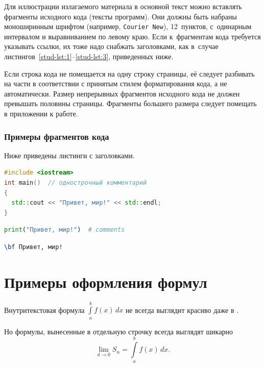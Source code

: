 \documentclass[14pt]{mmcs_article}
\begin{document}
Для иллюстрации излагаемого материала в основной текст можно вставлять фрагменты исходного кода (тексты программ). Они должны быть набраны моноширинным шрифтом (например, \texttt{Courier New}), 12~пунктов, с~одинарным интервалом и выравниванием по левому краю. Если к~фрагментам кода требуется указывать ссылки, их тоже надо снабжать заголовками, как в~случае листингов~\ref{stud-lst:1}--\ref{stud-lst:3}, приведенных ниже.

Если строка кода не помещается на одну строку страницы, её следует разбивать на части в соответствии с принятым стилем форматирования кода, а не автоматически. Размер непрерывных фрагментов исходного кода не должен превышать половины страницы. Фрагменты большего размера следует помещать в приложении к работе.


\subsubsection{Примеры фрагментов кода}

Ниже приведены листинги с заголовками.

\begin{lstlisting}[language=C++, caption={C++, пример кода}, label=stud-lst:1]
#include <iostream>
int main()  // однострочный комментарий
{
  std::cout << "Привет, мир!" << std::endl;
}
\end{lstlisting}


\begin{lstlisting}[language=Python, caption={Python, пример кода}, label=stud-lst:2]
print("Привет, мир!")  # comments
\end{lstlisting}

\begin{lstlisting}[language=TeX, caption=\LaTeX, label=stud-lst:3]
% параметр language в наших листингах только для себя
\bf Привет, мир!
\end{lstlisting}



\newpage
\section{Примеры оформления формул}

Внутритекстовая формула
$ \int\limits_a^b f(x)\,dx$ не всегда выглядит красиво даже в \LaTeXe.

Но формулы, вынесенные в отдельную строчку всегда выглядят шикарно
\[
  \lim_{d\to 0} S_n =
  \int\limits_a^b f(x)\,dx.
\]
\end{document}
